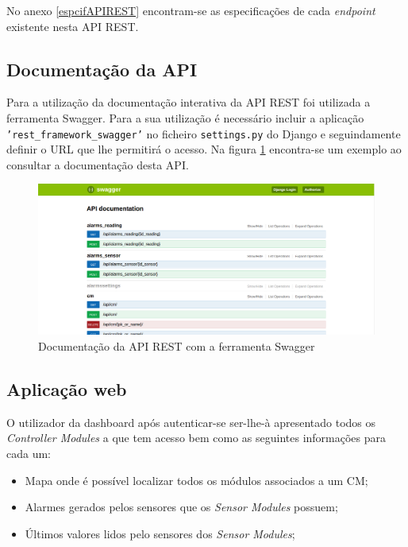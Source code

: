No anexo \ref{espcifAPIREST} encontram-se as especificações de cada \textit{endpoint} existente nesta API REST.






\subsection{Documentação da \ac{API}}

Para a utilização da documentação interativa da API REST foi utilizada a ferramenta Swagger. Para a sua utilização é necessário incluir a aplicação \texttt{'rest\_framework\_swagger'} no ficheiro \texttt{settings.py} do Django e seguindamente definir o \ac{URL} que lhe permitirá o acesso. Na figura \ref{docapi} encontra-se um exemplo ao consultar a documentação desta API. 



\begin{figure}[h]
	\centering
	\includegraphics[width=0.64\linewidth]{prints-web/api-doc.png}
	\caption{Documentação da API REST com a ferramenta Swagger}
	\label{docapi}
\end{figure}


\subsection{Aplicação web}

O utilizador da dashboard após autenticar-se ser-lhe-à apresentado todos os \textit{Controller Modules} a que tem acesso bem como as seguintes informações para cada um:


\begin{itemize}
	\item Mapa onde é possível localizar todos os módulos associados a um \acl{CM}; 
	
	\item Alarmes gerados pelos sensores que os \textit{Sensor Modules} possuem; 
	
	\item Últimos valores lidos pelo sensores dos \textit{Sensor Modules}; 
\end{itemize} 



